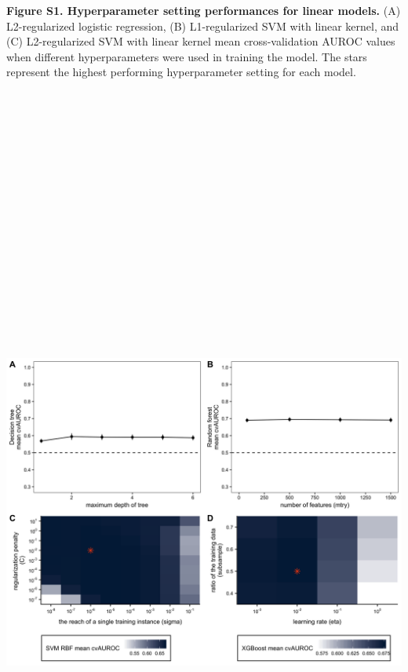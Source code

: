 \documentclass[11pt,]{article}
\begin{document}
\textbf{Figure S1. Hyperparameter setting performances for linear
models.} (A) L2-regularized logistic regression, (B) L1-regularized SVM
with linear kernel, and (C) L2-regularized SVM with linear kernel mean
cross-validation AUROC values when different hyperparameters were used
in training the model. The stars represent the highest performing
hyperparameter setting for each model. \newpage
\includegraphics[height=30cm, width=15cm]{Figure_S2.png}
\end{document}
